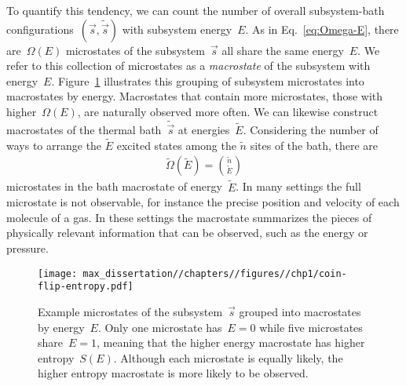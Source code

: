 To quantify this tendency, we can count the number of overall subsystem-bath configurations~$(\vec{s},\tilde{\vec{s}})$ with subsystem energy~$E$. As in Eq.~\eqref{eq:Omega-E}, there are~$\Omega(E)$ microstates of the subsystem~$\vec{s}$ all share the same energy~$E$. We refer to this collection of microstates as a \emph{macrostate} of the subsystem with energy~$E$. Figure~\ref{fig:coin-flip-entropy} illustrates this grouping of subsystem microstates into macrostates by energy. Macrostates that contain more microstates, those with higher~$\Omega(E)$, are naturally observed more often. We can likewise construct macrostates of the thermal bath~$\tilde{\vec{s}}$ at energies~$\tilde{E}$. Considering the number of ways to arrange the $\tilde{E}$ excited states among the $\tilde{n}$ sites of the bath, there are \begin{align}
    \tilde{\Omega}(\tilde{E}) = \binom{\tilde{n}}{\tilde{E}}
\end{align}
microstates in the bath macrostate of energy~$\tilde{E}$. In many settings the full microstate is not observable, for instance the precise position and velocity of each molecule of a gas. In these settings the macrostate summarizes the pieces of physically relevant information that can be observed, such as the energy or pressure.

\begin{figure}
    \centering
    \texttt{[image: max\_dissertation//chapters//figures//chp1/coin-flip-entropy.pdf]}
    \caption{Example microstates of the subsystem~$\vec{s}$ grouped into macrostates by energy~$E$. Only one microstate has~$E = 0$ while five microstates share~$E = 1$, meaning that the higher energy macrostate has higher entropy~$S(E)$. Although each microstate is equally likely, the higher entropy macrostate is more likely to be observed.}
    \label{fig:coin-flip-entropy}
\end{figure}

